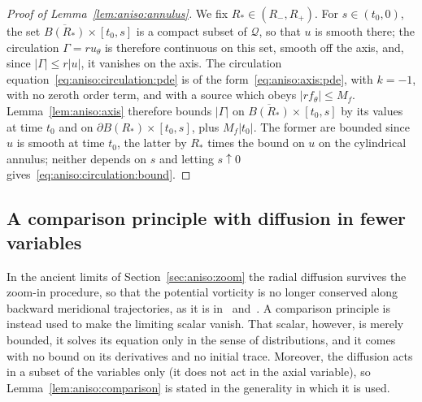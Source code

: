 \documentclass[11pt,reqno]{amsproc}
\numberwithin{equation}{section}
\theoremstyle{remark}
\begin{document}
\begin{proof}[Proof of Lemma~\ref{lem:aniso:annulus}]
We fix $R_*\in(R_-,R_+)$. For $s\in(t_0,0)$, the set $\overline{B(R_*)}\times[t_0,s]$ is a compact subset of $\mathcal Q$, so that $u$ is smooth there; the circulation $\Gamma=ru_\theta$ is therefore continuous on this set, smooth off the axis, and, since $|\Gamma|\le r|u|$, it vanishes on the axis. The circulation equation~\eqref{eq:aniso:circulation:pde} is of the form~\eqref{eq:aniso:axis:pde}, with $k=-1$, with no zeroth order term, and with a source which obeys $|rf_\theta|\le M_f$. Lemma~\ref{lem:aniso:axis} therefore bounds $|\Gamma|$ on $\overline{B(R_*)}\times[t_0,s]$ by its values at time $t_0$ and on $\partial B(R_*)\times[t_0,s]$, plus $M_f|t_0|$. The former are bounded since $u$ is smooth at time $t_0$, the latter by $R_*$ times the bound on $u$ on the cylindrical annulus; neither depends on $s$ and letting $s\uparrow0$ gives~\eqref{eq:aniso:circulation:bound}.
\end{proof}

\subsection{A comparison principle with diffusion in fewer variables}
\label{sec:aniso:maximum}

In the ancient limits of Section~\ref{sec:aniso:zoom} the radial diffusion survives the zoom-in procedure, so that the potential vorticity is no longer conserved along backward meridional trajectories, as it is in~\cite{CIV26} and~\cite{CIVEulerLength}. A comparison principle is instead used to make the limiting scalar vanish. That scalar, however, is merely bounded, it solves its equation only in the sense of distributions, and it comes with no bound on its derivatives and no initial trace. Moreover, the diffusion acts in a subset of the variables only (it does not act in the axial variable), so Lemma~\ref{lem:aniso:comparison} is stated in the generality in which it is used.
\end{document}
